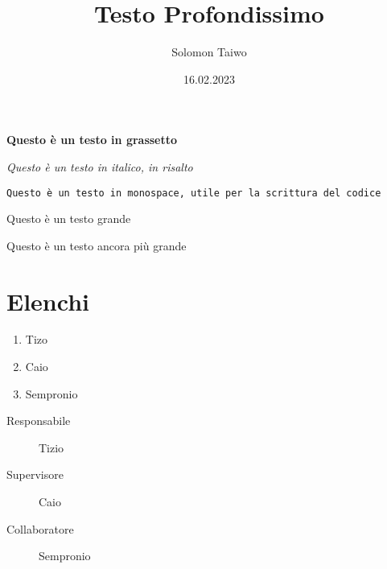 \documentclass{article}
\begin{document}
\title{Testo Profondissimo}
\author{Solomon Taiwo}
\date{16.02.2023}

\maketitle

\tableofcontents %

\textbf{Questo è un testo in grassetto}

\emph{Questo è un testo in italico, in risalto}

\texttt{Questo è un testo in monospace, utile per la scrittura del codice}

\large{Questo è un testo grande}

\par %

\Large{Questo è un testo ancora più grande}

\section{Elenchi}

\begin{enumerate}
    \item Tizo
    \item Caio
    \item Sempronio
\end{enumerate}

\begin{description}
    \item[Responsabile] Tizio
    \item[Supervisore] Caio
    \item[Collaboratore] Sempronio
\end{description}
\end{document}
